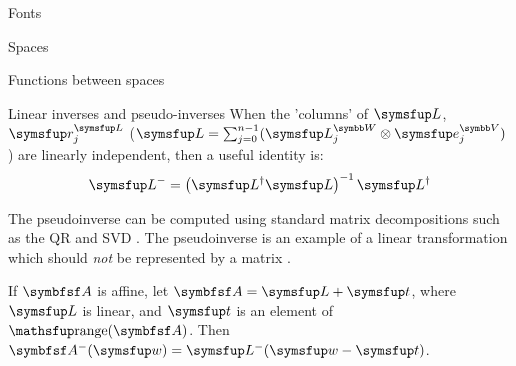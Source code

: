 \documentclass[12pt]{PalisadesLakesArticle}
\begin{document}
\begin{plSection}{Fonts}
\begin{plSection}{Spaces}
\begin{plSection}{Functions between spaces}
\begin{plSection}{Linear inverses and pseudo-inverses}
When the 'columns' of $\Vector{L}$, $\Vector{r}_j^{\Vector{L}}$
($\Vector{L} = \sum_{j=0}^{n-1} ( \Vector{L}_j^{\Space{W}} \otimes \Vector{e}_j^{\Space{V}} )$)
are linearly independent,
then a useful identity is:
\begin{equation}
\label{eq:full-rank-pseudo-inverse}
\Vector{L}^{-} = \left( \Vector{L}^{\dagger} \Vector{L} \right)^{-1} \Vector{L}^{\dagger}
\end{equation}

The pseudoinverse can be computed
using standard matrix decompositions such as
the QR and SVD .
The pseudoinverse is an example of a linear transformation
which should {\em not} be represented by a matrix
.

If $\Point{A}$ is affine,
let $\Point{A} = \Vector{L} + \Vector{t}$,
where $\Vector{L}$ is linear,
and $\Vector{t}$ is an element of $\range(\Point{A})$.
Then $\Point{A}^{-}(\Vector{w}) = \Vector{L}^{-}( \Vector{w} - \Vector{t} )$.
\end{plSection}%
\end{plSection}%
\end{plSection}%
\end{plSection}%
\end{document}

